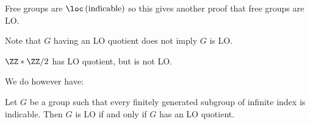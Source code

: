 \begin{rmk}
Free groups are $\loc\left(\text{indicable}\right)$ so this gives  another proof that free
groups are LO.
\end{rmk}

\begin{rmk}
Note that $G$ having an LO quotient does not imply 
$G$ is LO. 
\begin{cexm}
$\ZZ * \ZZ / 2$ has LO quotient, but is not LO.
\end{cexm}
We do however have:
\end{rmk}

\begin{thm}
Let $G$ be a group such that every finitely generated subgroup of infinite index is
indicable. Then $G$ is LO if and only if $G$ has an LO quotient.
\label{thm:2.13}
\end{thm}
